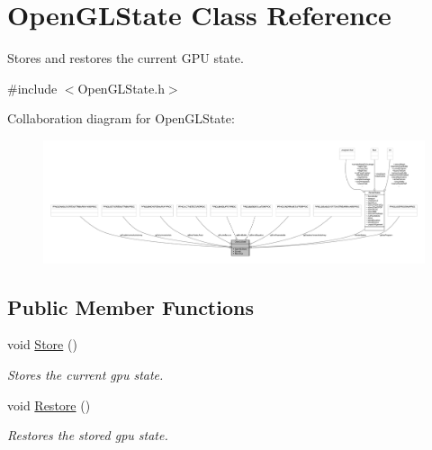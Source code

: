 \hypertarget{class_open_g_l_state}{\section{Open\-G\-L\-State Class Reference}
\label{class_open_g_l_state}
}


Stores and restores the current G\-P\-U state.  




{\ttfamily \#include $<$Open\-G\-L\-State.\-h$>$}



Collaboration diagram for Open\-G\-L\-State\-:
\nopagebreak
\begin{figure}[H]
\begin{center}
\leavevmode
\includegraphics[width=350pt]{class_open_g_l_state__coll__graph}
\end{center}
\end{figure}
\subsection*{Public Member Functions}
\begin{DoxyCompactItemize}
\item 
\hypertarget{class_open_g_l_state_a8078b65f6b29b681960ba03b6d35160e}{void \hyperlink{class_open_g_l_state_a8078b65f6b29b681960ba03b6d35160e}{Store} ()}\label{class_open_g_l_state_a8078b65f6b29b681960ba03b6d35160e}

\begin{DoxyCompactList}\small\item\em Stores the current gpu state. \end{DoxyCompactList}\item 
\hypertarget{class_open_g_l_state_a08189bfef75f3408539b1e570d14d838}{void \hyperlink{class_open_g_l_state_a08189bfef75f3408539b1e570d14d838}{Restore} ()}\label{class_open_g_l_state_a08189bfef75f3408539b1e570d14d838}

\begin{DoxyCompactList}\small\item\em Restores the stored gpu state. \end{DoxyCompactList}\end{DoxyCompactItemize}
